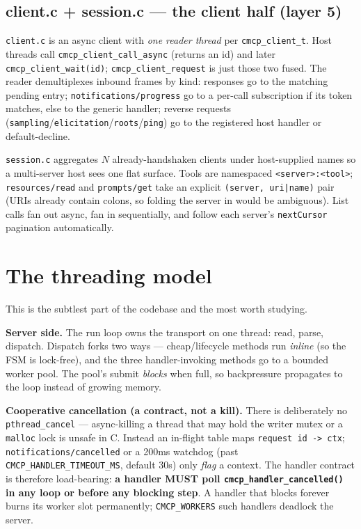\documentclass[10pt]{article}
\newcommand{\code}[1]{\texttt{\small #1}}
\begin{document}
\subsection{client.c + session.c --- the client half (layer 5)}

\code{client.c} is an async client with \emph{one reader thread} per
\code{cmcp\_client\_t}. Host threads call \code{cmcp\_client\_call\_async} (returns
an id) and later \code{cmcp\_client\_wait(id)}; \code{cmcp\_client\_request} is
just those two fused. The reader demultiplexes inbound frames by kind: responses
go to the matching pending entry; \code{notifications/progress} go to a per-call
subscription if its token matches, else to the generic handler; reverse requests
(\code{sampling}/\code{elicitation}/\code{roots}/\code{ping}) go to the registered
host handler or default-decline.

\code{session.c} aggregates $N$ already-handshaken clients under host-supplied
names so a multi-server host sees one flat surface. Tools are namespaced
\code{<server>:<tool>}; \code{resources/read} and \code{prompts/get} take an
explicit \code{(server, uri|name)} pair (URIs already contain colons, so folding
the server in would be ambiguous). List calls fan out async, fan in sequentially,
and follow each server's \code{nextCursor} pagination automatically.

\section{The threading model}

This is the subtlest part of the codebase and the most worth studying.

\textbf{Server side.} The run loop owns the transport on one thread: read, parse,
dispatch. Dispatch forks two ways --- cheap/lifecycle methods run \emph{inline}
(so the FSM is lock-free), and the three handler-invoking methods go to a bounded
worker pool. The pool's submit \emph{blocks} when full, so backpressure
propagates to the loop instead of growing memory.

\textbf{Cooperative cancellation (a contract, not a kill).} There is deliberately
no \code{pthread\_cancel} --- async-killing a thread that may hold the writer
mutex or a \code{malloc} lock is unsafe in C. Instead an in-flight table maps
\code{request id -> ctx}; \code{notifications/cancelled} or a 200ms watchdog (past
\code{CMCP\_HANDLER\_TIMEOUT\_MS}, default 30s) only \emph{flag} a context. The
handler contract is therefore load-bearing: \textbf{a handler MUST poll
\code{cmcp\_handler\_cancelled()} in any loop or before any blocking step}. A
handler that blocks forever burns its worker slot permanently; \code{CMCP\_WORKERS}
such handlers deadlock the server.
\end{document}
